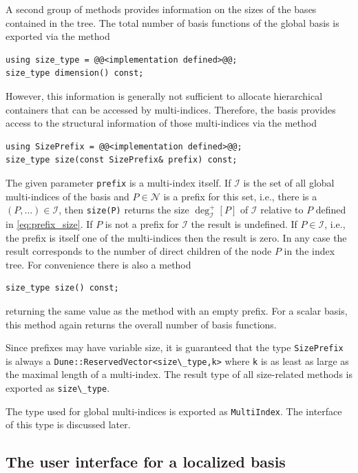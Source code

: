 \documentclass[a4paper,10pt,headings=normal,bibliography=totoc]{scrartcl}
\newcommand{\cpp}[1]{\lstinline[basicstyle=\ttfamily]!#1!}
\begin{document}
A second group of methods provides information on the sizes of the bases
contained in the tree.
The total number of basis functions of the global basis is
exported via the method
\begin{lstlisting}[style=Interface]
using size_type = @@<implementation defined>@@;
size_type dimension() const;
\end{lstlisting}
However, this information is generally not
sufficient to allocate hierarchical containers that can be
accessed by multi-indices.
Therefore, the basis provides access to the structural
information of those multi-indices via the method
\begin{lstlisting}[style=Interface]
using SizePrefix = @@<implementation defined>@@;
size_type size(const SizePrefix& prefix) const;
\end{lstlisting}
The given parameter \cpp{prefix} is a multi-index itself.
If $\mathcal{I}$ is the set of all global multi-indices of the
basis and $P \in \mathcal{N}$ is a prefix for this set,
i.e., there is a $(P,\dots) \in \mathcal{I}$, then
\cpp{size(P)} returns the size $\operatorname{deg}^+_{\mathcal{I}}[P]$ of
$\mathcal{I}$ relative to $P$ defined in \eqref{eq:prefix_size}.
If $P$ is not a prefix for $\mathcal{I}$ the result is undefined.
If $P \in \mathcal{I}$, i.e., the prefix is itself one of the multi-indices
then the result is zero.
In any case the result corresponds to the number of direct children
of the node $P$ in the index tree.
For convenience there is also a method
\begin{lstlisting}[style=Interface]
size_type size() const;
\end{lstlisting}
returning the same value as the method with an empty prefix.
For a scalar basis, this method again returns the overall number of basis functions.

Since prefixes may have variable size, it is guaranteed that the type \cpp{SizePrefix}
is always a \cpp{Dune::ReservedVector<size\_type,k>} where \cpp{k}
is as least as large as the maximal length of a multi-index. The result
type of all size-related methods is exported as \cpp{size\_type}.

The type used for global multi-indices is exported as \cpp{MultiIndex}.
The interface of this type is discussed later.


\subsection{The user interface for a localized basis}
\label{sec:localview_interface}
\end{document}
